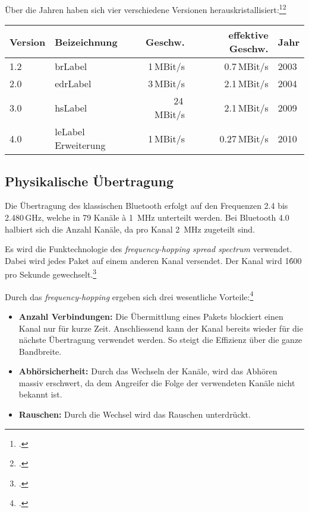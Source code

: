 Über die Jahren haben sich vier verschiedene Versionen herauskristallisiert:\footcite{Bluetooth_low_energy_Wikipedia_2015-04-17}\footcite{Our_History_Bluetooth_Technology_Website_2015-04-17}
\begin{table}[H]
\small\sffamily\renewcommand{\arraystretch}{1.4}
\begin{tabular}{llrrl}
\toprule
	Version & Beizeichnung & Geschw. & effektive Geschw.  & Jahr\\
\midrule
	1.2 & \gls{brLabel} & 1\,MBit/s & 0.7\,MBit/s & 2003 \\
	2.0 & \gls{edrLabel} & 3\,MBit/s & 2.1\,MBit/s & 2004 \\
	3.0 & \gls{hsLabel} & 24\,MBit/s & 2.1\,MBit/s & 2009\\
	4.0 & \gls{leLabel} Erweiterung & 1\,MBit/s &  0.27\,MBit/s & 2010 \\
\bottomrule
\end{tabular}
\end{table}



\subsection{Physikalische Übertragung}
Die Übertragung des klassischen Bluetooth erfolgt auf den Frequenzen 2.4 bis 2.480\,GHz, welche in 79 Kanäle à 1\, MHz unterteilt werden.
Bei Bluetooth 4.0 halbiert sich die Anzahl Kanäle, da pro Kanal 2\, MHz zugeteilt sind.

Es wird die Funktechnologie des \textit{frequency-hopping spread spectrum} verwendet.
Dabei wird jedes Paket auf einem anderen Kanal versendet.
Der Kanal wird 1\'600 pro Sekunde gewechselt.\footcite{Bluetooth_Wikipedia_2015-04-17}

Durch das \textit{frequency-hopping} ergeben sich drei wesentliche Vorteile:\footcite{Frequency-hopping_spread_spectrum_-_Wikipedia_2015-04-17}
\begin{itemize}
	\item \textbf{Anzahl Verbindungen:} Die Übermittlung eines Pakets blockiert einen Kanal nur für kurze Zeit.
		Anschliessend kann der Kanal bereits wieder für die nächste Übertragung verwendet werden.
		So steigt die Effizienz über die ganze Bandbreite.
	\item \textbf{Abhörsicherheit:} Durch das Wechseln der Kanäle, wird das Abhören massiv erschwert, da dem Angreifer die Folge der verwendeten Kanäle nicht bekannt ist.
	\item \textbf{Rauschen:} Durch die Wechsel wird das Rauschen unterdrückt.
\end{itemize}

